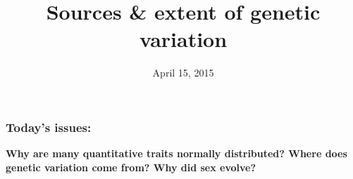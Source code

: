 





\title[Genetic variation]{Sources \& extent of genetic variation}
\date{April 15, 2015}



\begin{noheadline}
\maketitle
\end{noheadline}


\begin{noheadline}
\begin{frame}
\frametitle{Today's issues:}
\textbf{Why are many quantitative traits normally distributed? Where does
    genetic variation come from? Why did sex evolve?} \\
\vspace{5mm}
\tableofcontents[subsectionstyle=hide]
\end{frame}
\end{noheadline}


